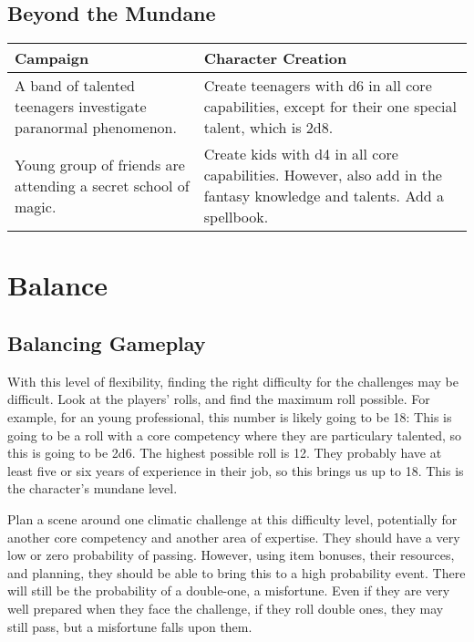 \documentclass{LegrandOrangeTufteBook}
\newcommand{\term}[1]{\textcolor{colorTerm}{#1}}
\begin{document}
\subsection*{Beyond the Mundane}
\begin{center}
	\begin{xltabular}{\textwidth}{XX}
		Campaign & Character Creation \\
		\hline
{}    A band of talented teenagers investigate paranormal phenomenon. & Create teenagers with d6 in all \term{core capabilities}, except for their one special talent, which is 2d8.\\
   				Young group of friends are attending a secret school of magic. & Create kids with d4 in all \term{core capabilities}. However, also add in the fantasy knowledge and talents. Add a spellbook. \\

	\end{xltabular}
\end{center}

\section*{Balance}

\subsection*{Balancing Gameplay}

With this level of flexibility, finding the right difficulty for the challenges may be difficult. Look at the players' rolls, and find the maximum roll possible. For example, for an young professional,
this number is likely going to be 18: This is going to be a roll with a \term{core competency} where they are particulary talented, so this is going to be 2d6. The highest possible roll is 12. They probably have at least five or six years of experience in their job, so this brings us up to 18. This is the character's \term{mundane level}.

Plan a scene around one climatic challenge at this \term{difficulty level}, potentially for another \term{core competency} and another area of \term{expertise}. They should have a very low or zero probability of passing. However, using item bonuses, their \term{resources}, and planning, they should be able to bring this to a high probability event. There will still be the probability of a double-one, a \term{misfortune}. Even if they are very well prepared when they face the challenge, if they roll double ones, they may still pass, but a misfortune falls upon them.
\end{document}
